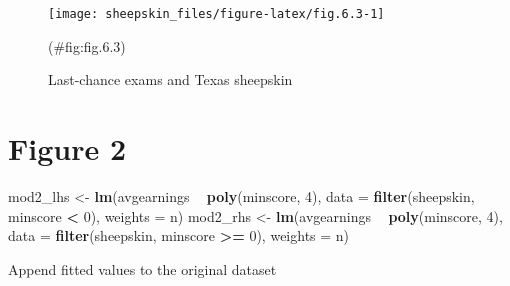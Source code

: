 \documentclass[]{book}
\newenvironment{Shaded}{\begin{snugshade}}{\end{snugshade}}
\newcommand{\KeywordTok}[1]{\textcolor[rgb]{0.13,0.29,0.53}{\textbf{#1}}}
\newcommand{\DataTypeTok}[1]{\textcolor[rgb]{0.13,0.29,0.53}{#1}}
\newcommand{\DecValTok}[1]{\textcolor[rgb]{0.00,0.00,0.81}{#1}}
\newcommand{\StringTok}[1]{\textcolor[rgb]{0.31,0.60,0.02}{#1}}
\newcommand{\OtherTok}[1]{\textcolor[rgb]{0.56,0.35,0.01}{#1}}
\newcommand{\OperatorTok}[1]{\textcolor[rgb]{0.81,0.36,0.00}{\textbf{#1}}}
\newcommand{\NormalTok}[1]{#1}
\theoremstyle{definition}
\theoremstyle{definition}
\theoremstyle{definition}
\theoremstyle{remark}
\begin{document}
\begin{figure}

{\centering \texttt{[image: sheepskin\_files/figure-latex/fig.6.3-1]} 

}

\caption{Last-chance exams and Texas sheepskin}(\#fig:fig.6.3)
\end{figure}

\section{Figure 2}\label{figure-2}

\begin{Shaded}
\begin{Highlighting}[]
\NormalTok{mod2_lhs <-}\StringTok{ }\KeywordTok{lm}\NormalTok{(avgearnings }\OperatorTok{~}\StringTok{ }\KeywordTok{poly}\NormalTok{(minscore, }\DecValTok{4}\NormalTok{),}
               \DataTypeTok{data =} \KeywordTok{filter}\NormalTok{(sheepskin, minscore }\OperatorTok{<}\StringTok{ }\DecValTok{0}\NormalTok{),}
               \DataTypeTok{weights =}\NormalTok{ n)}
\NormalTok{mod2_rhs <-}\StringTok{ }\KeywordTok{lm}\NormalTok{(avgearnings }\OperatorTok{~}\StringTok{ }\KeywordTok{poly}\NormalTok{(minscore, }\DecValTok{4}\NormalTok{),}
               \DataTypeTok{data =} \KeywordTok{filter}\NormalTok{(sheepskin, minscore }\OperatorTok{>=}\StringTok{ }\DecValTok{0}\NormalTok{), }\DataTypeTok{weights =}\NormalTok{ n)}
\end{Highlighting}
\end{Shaded}

Append fitted values to the original dataset

\begin{Shaded}
\end{Shaded}
\end{document}
